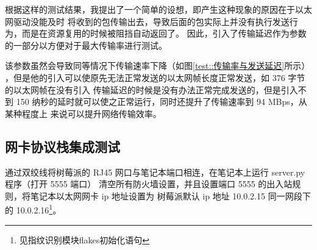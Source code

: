 
    根据这样的测试结果，我提出了一个简单的设想，即产生这种现象的原因在于以太网驱动没能及时
    将收到的包传输出去，导致后面的包实际上并没有执行发送行为，而是在资源复用的时候被阻挡自动返回了。
    因此，引入了传输延迟作为参数的一部分以方便对于最大传输率进行测试。

    该参数虽然会导致同等情况下传输速率下降（如图\ref{test::传输率与发送延迟}所示）
    ，但是他的引入可以使原先无法正常发送的以太网帧长度正常发送，如 376 字节的以太网帧在没有引入
    传输延迟的时候是没有办法正常完成发送的，但是引入不到 150 纳秒的延时就可以使之正常运行，同时还提升了传输速率到 94 MBps，从某种程度上
    来说可以提升网络传输效率。

        \label{test::传输率与发送延迟}

    \subsection{网卡协议栈集成测试}

    通过双绞线将树莓派的 RJ45 网口与笔记本端口相连，在笔记本上运行 server.py 程序（打开 5555 端口）
    清空所有防火墙设置，并且设置端口 5555 的出入站规则，将笔记本以太网网卡 ip 地址设置为
    树莓派默认 ip 地址 10.0.2.15 同一网段下的 10.0.2.16\footnote{见指纹识别模块flakes初始化语句}。

